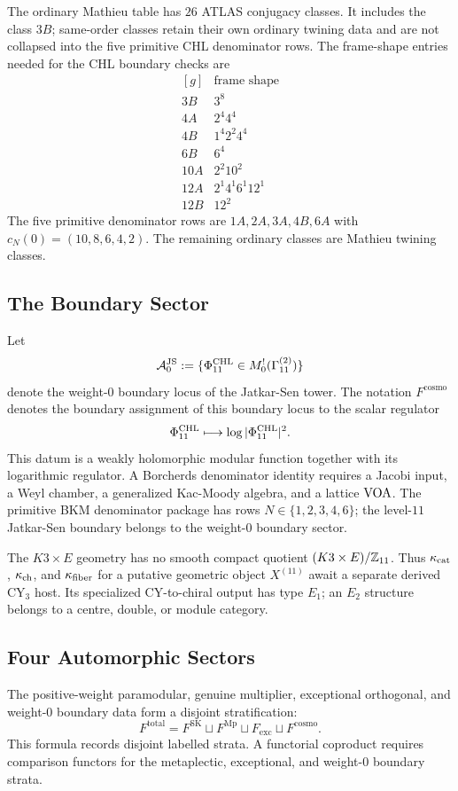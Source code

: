 The ordinary Mathieu table has $26$ ATLAS conjugacy classes. It includes
the class $3B$; same-order classes retain their own ordinary twining
data and are not collapsed into the five primitive CHL denominator rows.
The frame-shape entries needed for the CHL boundary checks are
\[
\begin{array}{c|c}
[g] & \text{frame shape}\\
\hline
3B  & 3^8\\
4A  & 2^4 4^4\\
4B  & 1^4 2^2 4^4\\
6B  & 6^4\\
10A & 2^2 10^2\\
12A & 2^1 4^1 6^1 12^1\\
12B & 12^2
\end{array}
\]
The five primitive denominator rows are $1A,2A,3A,4B,6A$ with
$c_N(0)=(10,8,6,4,2)$. The remaining ordinary classes are Mathieu
twining classes.

\subsection{The Boundary Sector}

Let
\[
  \mathcal{A}^{\mathrm{JS}}_0
  :=\{\Phi^{\mathrm{CHL}}_{11}\in M^{!}_0(\Gamma^{(2)}_{11})\}
\]
denote the weight-$0$ boundary locus of the Jatkar-Sen tower. The
notation $F^{\mathrm{cosmo}}$ denotes the boundary assignment of this
boundary locus to the scalar regulator
\[
  \Phi^{\mathrm{CHL}}_{11}\longmapsto \log |\Phi^{\mathrm{CHL}}_{11}|^2 .
\]
This datum is a weakly holomorphic modular function together with its
logarithmic regulator. A Borcherds denominator identity requires a
Jacobi input, a Weyl chamber, a generalized Kac-Moody algebra, and a
lattice $\mathrm{VOA}$. The primitive BKM denominator package has rows
$N\in\{1,2,3,4,6\}$; the level-$11$ Jatkar-Sen boundary belongs to the
weight-$0$ boundary sector.

The $K3\times E$ geometry has no smooth compact quotient
$(K3\times E)/\mathbb{Z}_{11}$. Thus $\kappa_{\mathrm{cat}}$, $\kappa_{\mathrm{ch}}$, and $\kappa_{\mathrm{fiber}}$ for a putative
geometric object $X^{(11)}$ await a separate derived CY$_3$ host. Its
specialized CY-to-chiral output has type $E_1$; an $E_2$ structure
belongs to a centre, double, or module category.

\subsection{Four Automorphic Sectors}

The positive-weight paramodular, genuine multiplier, exceptional
orthogonal, and weight-$0$ boundary data form a disjoint stratification:
\[
  F^{\mathrm{total}}
  =
  F^{\mathrm{SK}}
  \sqcup F^{\mathrm{Mp}}
  \sqcup F_{\mathrm{exc}}
  \sqcup F^{\mathrm{cosmo}} .
\]
This formula records disjoint labelled strata. A functorial coproduct
requires comparison functors for the metaplectic, exceptional, and
weight-$0$ boundary strata.

